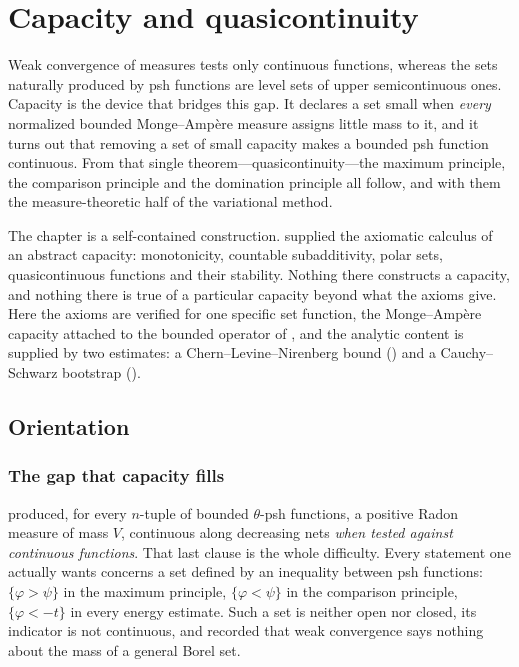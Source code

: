 \chapter{Capacity and quasicontinuity}
\label{chap:bfj-capacity}

Weak convergence of measures tests only continuous functions, whereas the
sets naturally produced by psh functions are level sets of upper
semicontinuous ones.  Capacity is the device that bridges this gap.  It
declares a set small when \emph{every} normalized bounded Monge--Amp\`ere
measure assigns little mass to it, and it turns out that removing a set of
small capacity makes a bounded psh function continuous.  From that single
theorem---quasicontinuity---the maximum principle, the comparison principle
and the domination principle all follow, and with them the measure-theoretic
half of the variational method.

The chapter is a self-contained construction.  
supplied the axiomatic calculus of an abstract capacity: monotonicity,
countable subadditivity, polar sets, quasicontinuous functions and their
stability.  Nothing there constructs a capacity, and nothing there is true of
a particular capacity beyond what the axioms give.  Here the axioms are
verified for one specific set function, the Monge--Amp\`ere capacity attached
to the bounded operator of , and the analytic content is
supplied by two estimates: a Chern--Levine--Nirenberg bound
() and a Cauchy--Schwarz bootstrap
().

\section{Orientation}
\label{sec:ch25-orientation}

\subsection{The gap that capacity fills}
\label{sec:ch25-gap}

 produced, for every \(n\)-tuple of bounded
\(\theta\)-psh functions, a positive Radon measure of mass \(V\), continuous
along decreasing nets \emph{when tested against continuous functions}.  That
last clause is the whole difficulty.  Every statement one actually wants
concerns a set defined by an inequality between psh functions:
\(\{\varphi>\psi\}\) in the maximum principle, \(\{\varphi<\psi\}\) in the
comparison principle, \(\{\varphi<-t\}\) in every energy estimate.  Such a
set is neither open nor closed, its indicator is not continuous, and
 recorded that weak convergence says nothing
about the mass of a general Borel set.

